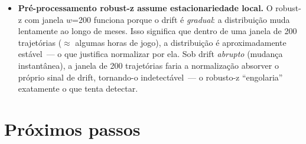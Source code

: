 \documentclass[11pt,a4paper]{article}
\begin{document}
\begin{itemize}[leftmargin=1.4em,itemsep=4pt]
    \item \textbf{Pr\'e-processamento robust-z assume estacionariedade local.} O robust-z com janela $w$=200 funciona porque o drift \'e \emph{gradual}: a distribui\c{c}\~ao muda lentamente ao longo de meses. Isso significa que dentro de uma janela de 200 trajet\'orias ($\approx$ algumas horas de jogo), a distribui\c{c}\~ao \'e aproximadamente est\'avel~--- o que justifica normalizar por ela. Sob drift \emph{abrupto} (mudan\c{c}a instant\^anea), a janela de 200 trajet\'orias faria a normaliza\c{c}\~ao absorver o pr\'oprio sinal de drift, tornando-o indetect\'avel~--- o robusto-z ``engolaria'' exatamente o que tenta detectar.
\end{itemize}

\section{Pr\'oximos passos}
\end{document}
